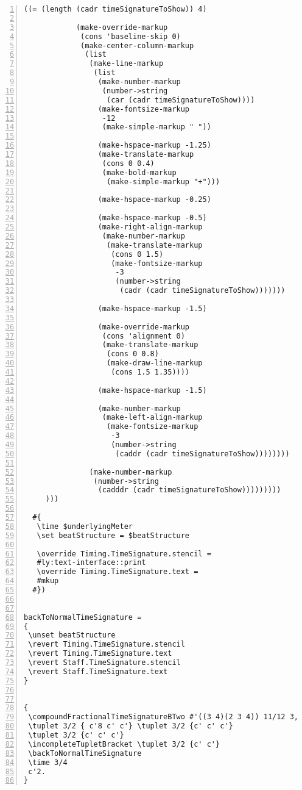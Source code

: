 \begin{Verbatim}[numbers=left,xleftmargin=5mm]
           ((= (length (cadr timeSignatureToShow)) 4)

            (make-override-markup
             (cons 'baseline-skip 0)
             (make-center-column-markup
              (list
               (make-line-markup
                (list
                 (make-number-markup
                  (number->string
                   (car (cadr timeSignatureToShow))))
                 (make-fontsize-markup
                  -12
                  (make-simple-markup " "))

                 (make-hspace-markup -1.25)
                 (make-translate-markup
                  (cons 0 0.4)
                  (make-bold-markup
                   (make-simple-markup "+")))

                 (make-hspace-markup -0.25)

                 (make-hspace-markup -0.5)
                 (make-right-align-markup
                  (make-number-markup
                   (make-translate-markup
                    (cons 0 1.5)
                    (make-fontsize-markup
                     -3
                     (number->string
                      (cadr (cadr timeSignatureToShow)))))))

                 (make-hspace-markup -1.5)

                 (make-override-markup
                  (cons 'alignment 0)
                  (make-translate-markup
                   (cons 0 0.8)
                   (make-draw-line-markup
                    (cons 1.5 1.35))))

                 (make-hspace-markup -1.5)

                 (make-number-markup
                  (make-left-align-markup
                   (make-fontsize-markup
                    -3
                    (number->string
                     (caddr (cadr timeSignatureToShow))))))))

               (make-number-markup
                (number->string
                 (cadddr (cadr timeSignatureToShow)))))))))
     )))

  #{
   \time $underlyingMeter
   \set beatStructure = $beatStructure

   \override Timing.TimeSignature.stencil =
   #ly:text-interface::print
   \override Timing.TimeSignature.text =
   #mkup
  #})


backToNormalTimeSignature =
{
 \unset beatStructure
 \revert Timing.TimeSignature.stencil
 \revert Timing.TimeSignature.text
 \revert Staff.TimeSignature.stencil
 \revert Staff.TimeSignature.text
}


{
 \compoundFractionalTimeSignatureBTwo #'((3 4)(2 3 4)) 11/12 3,3,3,2
 \tuplet 3/2 { c'8 c' c'} \tuplet 3/2 {c' c' c'}
 \tuplet 3/2 {c' c' c'}
 \incompleteTupletBracket \tuplet 3/2 {c' c'}
 \backToNormalTimeSignature
 \time 3/4
 c'2.
}

\end{Verbatim}
